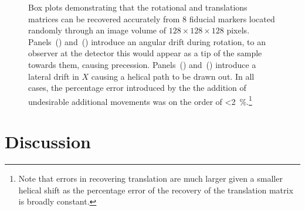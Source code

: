 \documentclass{osa-article}
\begin{document}
\begin{figure}
  \caption[Box plots demonstrating that the rotational and translations matrices can be recovered accurately from fiducial marker positions]{Box plots demonstrating that the rotational and translations matrices can be recovered accurately from 8 fiducial markers located randomly through an image volume of \(128\times128\times128\) pixels.
    Panels~() and~() introduce an angular drift during rotation, to an observer at the detector this would appear as a tip of the sample towards them, causing precession.
    Panels~() and~() introduce a lateral drift in \(X\) causing a helical path to be drawn out.
    In all cases, the percentage error introduced by the the addition of undesirable additional movements was on the order of \SI{<2}{\percent}.\footnote{Note that errors in recovering translation are much larger given a smaller helical shift as the percentage error of the recovery of the translation matrix is broadly constant.}
  }\label{fig:pc_sum_decompose}
\end{figure}

\section*{Discussion}
\end{document}
